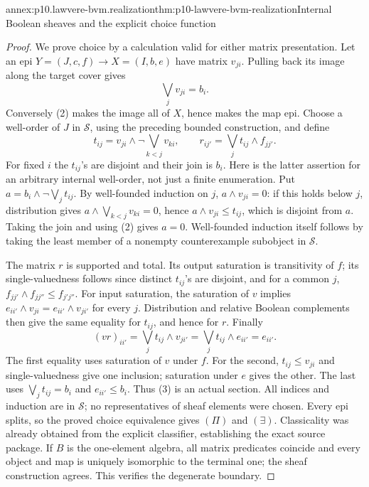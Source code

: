 \begin{annexitem}{annex:p10.lawvere-bvm.realization}{thm:p10-lawvere-bvm-realization}{Internal Boolean sheaves and the explicit choice function}
\begin{proof}
We prove choice by a calculation valid for either matrix presentation.
Let an epi \(Y=(J,c,f)\to X=(I,b,e)\) have matrix
\(v_{ji}\). Pulling back its image along the target cover gives
\[
                   \bigvee_j v_{ji}=b_i.                 \tag{2}
\]
Conversely (2) makes the image all of \(X\), hence makes the map
epi. Choose a well-order of \(J\) in \(\mathcal S\), using the
preceding bounded construction, and define
\[
 t_{ij}=v_{ji}\wedge\neg\bigvee_{k<j}v_{ki},\qquad
 r_{ij'}=\bigvee_j t_{ij}\wedge f_{jj'}.                \tag{3}
\]
For fixed \(i\) the \(t_{ij}\)'s are disjoint and their join
is \(b_i\). Here is the latter assertion for an arbitrary internal
well-order, not just a finite enumeration. Put
\(a=b_i\wedge\neg\bigvee_j t_{ij}\). By well-founded induction
on \(j\), \(a\wedge v_{ji}=0\): if this holds below \(j\),
distribution gives \(a\wedge\bigvee_{k<j}v_{ki}=0\), hence
\(a\wedge v_{ji}\le t_{ij}\), which is disjoint from \(a\).
Taking the join and using (2) gives \(a=0\). Well-founded induction
itself follows by taking the least member of a nonempty counterexample
subobject in \(\mathcal S\).

The matrix \(r\) is supported and total. Its output saturation is
transitivity of \(f\); its single-valuedness follows since distinct
\(t_{ij}\)'s are disjoint, and for a common \(j\),
\(f_{jj'}\wedge f_{jj''}\le f_{j'j''}\). For input saturation,
the saturation of \(v\) implies
\(e_{ii'}\wedge v_{ji}=e_{ii'}\wedge v_{ji'}\) for every
\(j\). Distribution and relative Boolean complements then give
the same equality for \(t_{ij}\), and hence for \(r\).
Finally
\[
 (vr)_{ii'}=\bigvee_j t_{ij}\wedge v_{ji'}
           =\bigvee_j t_{ij}\wedge e_{ii'}=e_{ii'}.
\]
The first equality uses saturation of \(v\) under \(f\).
For the second, \(t_{ij}\le v_{ji}\) and single-valuedness
give one inclusion; saturation under \(e\) gives the other.
The last uses \(\bigvee_j t_{ij}=b_i\) and \(e_{ii'}\le b_i\).
Thus (3) is an actual section. All indices and induction are in
\(\mathcal S\); no representatives of sheaf elements were chosen.
Every epi splits, so the proved choice equivalence gives
\((\Pi)\) and \((\exists)\). Classicality was already obtained
from the explicit classifier, establishing the exact source package.
If \(B\) is the one-element algebra, all matrix predicates coincide
and every object and map is uniquely isomorphic to the terminal one;
the sheaf construction agrees. This verifies the degenerate boundary.
\end{proof}
\end{annexitem}

